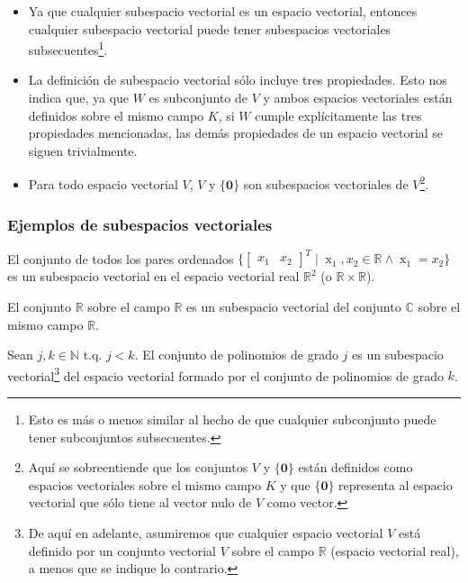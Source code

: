 \documentclass[12pt]{article}
\begin{document}
\begin{itemize}
    \item Ya que cualquier subespacio vectorial es un espacio vectorial, entonces cualquier subespacio vectorial puede tener subespacios vectoriales subsecuentes\footnote{Esto es más o menos similar al hecho de que cualquier subconjunto puede tener subconjuntos subsecuentes.}.
    \item La definición de subespacio vectorial sólo incluye tres propiedades. Esto nos indica que, ya que $W$ es subconjunto de $V$ y ambos espacios vectoriales están definidos sobre el mismo campo $K$, si $W$ cumple explícitamente las tres propiedades mencionadas, las demás propiedades de un espacio vectorial se siguen trivialmente.
    \item Para todo espacio vectorial $V$, $V$ y $\{\mathbf{0}\}$ son subespacios vectoriales de $V$\footnote{Aquí se sobreentiende que los conjuntos $V$ y $\{\mathbf{0}\}$ están definidos como espacios vectoriales sobre el mismo campo $K$ y que $\{\mathbf{0}\}$ representa al espacio vectorial que sólo tiene al vector nulo de $V$ como vector.}.
\end{itemize}{}

\subsubsection{Ejemplos de subespacios vectoriales}

El conjunto de todos los pares ordenados $\{\begin{bmatrix} x_1&x_2\end{bmatrix}^T\mathop |\mathop x_1,x_2\in\mathbb{R}\mathop\land\mathop x_1=x_2\}$ es un subespacio vectorial en el espacio vectorial real $\mathbb{R}^2$ (o $\mathbb{R}\times \mathbb{R}$).

\vspace{3mm}

El conjunto $\mathbb{R}$ sobre el campo $\mathbb{R}$ es un subespacio vectorial del conjunto $\mathbb{C}$ sobre el mismo campo $\mathbb{R}$.

\vspace{3mm}

Sean $j,k\in\mathbb{N}$ t.q. $j<k$. El conjunto de polinomios de grado $j$ es un subespacio vectorial\footnote{De aquí en adelante, asumiremos que cualquier espacio vectorial $V$ está definido por un conjunto vectorial $V$ sobre el campo $\mathbb{R}$ (espacio vectorial real), a menos que se indique lo contrario.} del espacio vectorial formado por el conjunto de polinomios de grado $k$.
\end{document}

